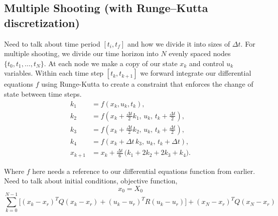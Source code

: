 \documentclass[]{article}
\begin{document}
\subsection*{Multiple Shooting (with Runge–Kutta discretization)}
Need to talk about time period $[t_i, t_f]$ and how we divide it into sizes of $\Delta t$.
For multiple shooting, we divide our time horizon into $N$ evenly spaced nodes $\{ t_0, t_1, \ldots, t_N \}$. At each node we make a copy of our state $x_k$ and control $u_k$ variables.  Within each time step $[ t_k, t_{k+1}]$ we forward integrate our differential equations $f$ using Runge-Kutta  to create a constraint that enforces the change of state between time steps. 
\begin{eqnarray}
		 \nonumber
        k_1 &= f(x_k, u_k, t_k), \\[6pt] \nonumber
        k_2 &= f\!\left(x_k + \tfrac{\Delta t}{2} k_1,\, u_k,\, t_k + \tfrac{\Delta t}{2}\right), \\[6pt]  \nonumber
        k_3 &= f\!\left(x_k + \tfrac{\Delta t}{2} k_2,\, u_k,\, t_k + \tfrac{\Delta t}{2}\right), \\[6pt]  \nonumber
        k_4 &= f\!\left(x_k + \Delta t\, k_3,\, u_k,\, t_k + \Delta t\right), \\[10pt]  
        x_{k+1} &= x_k + \tfrac{\Delta t}{6}\,\Big(k_1 + 2k_2 + 2k_3 + k_4\Big).  \label{eq.rkstate}
 \end{eqnarray}
 
 Where $f$ here needs a reference to our differential equations function from earlier. Need to talk about initial conditions, objective function, 
 \[ x_0 = X_0\]
 \begin{equation}
 	 \sum_{k=0}^{N-1}  \Big[(x_k -  x_{r})^T Q (x_k - x_{r}) + (u_k -  u_{r})^T R (u_k - u_{r}) \Big] + (x_N -  x_{r})^T Q (x_N - x_{r})
 \end{equation}

 
\end{document}
